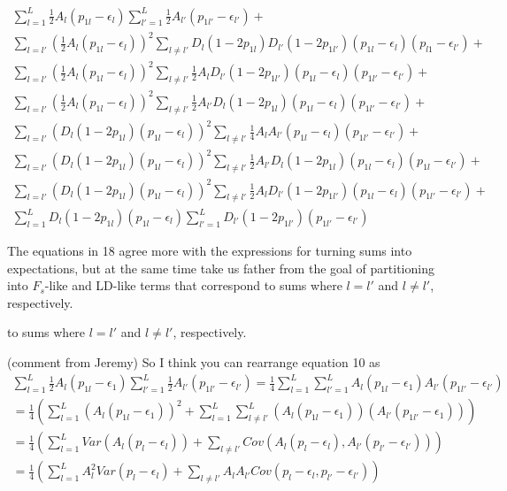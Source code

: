 \documentclass[a4paper,10pt]{article}
\newcommand{\jb}[1]{{\color{blue} (#1)} }
\begin{document}
\begin{equation}
  \begin{split}
   \sum^L_{l=1}\frac{1}{2}A_l(p_{1l}-\epsilon_{l})
   \sum^L_{l'=1}\frac{1}{2}A_{l'}(p_{1l'}-\epsilon_{l'}) +
   \\
   \sum_{l=l'}(\frac{1}{2}A_l(p_{1l}-\epsilon_l))^2 \sum_{l \neq
     l'}D_l(1-2p_{1l})D_{l'}(1-2p_{1l'})(p_{1l}-\epsilon_l)(p_{l1}-\epsilon_{l'})+ 
   \\
     \sum_{l=l'}(\frac{1}{2}A_l(p_{1l}-\epsilon_l))^2\sum_{l \neq
       l'}\frac{1}{2}A_{l}D_{l'}(1-2p_{1l'})(p_{1l}-\epsilon_l)(p_{1l'}-\epsilon_{l'})+
     \\
     \sum_{l=l'}(\frac{1}{2}A_l(p_{1l}-\epsilon_l))^2\sum_{l \neq
       l'}\frac{1}{2}A_{l'}D_l(1-2p_{1l})(p_{1l}-\epsilon_l)(p_{1l'}-\epsilon_{l'})+
   \\
   \sum_{l=l'}(D_l(1-2p_{1l})(p_{1l}-\epsilon_l))^2 \sum_{l \neq
     l'}\frac{1}{4}A_lA_{l'}(p_{1l}-\epsilon_l)(p_{1l'}-\epsilon_{l'}) +
   \\
   \sum_{l=l'}(D_l(1-2p_{1l})(p_{1l}-\epsilon_l))^2 \sum_{l\neq
     l'}
   \frac{1}{2}A_{l'}D_l(1-2p_{1l})(p_{1l}-\epsilon_l)(p_{1l}-\epsilon_{l'})+
   \\
   \sum_{l=l'}(D_l(1-2p_{1l})(p_{1l}-\epsilon_l))^2 \sum_{l\neq
     l'}
   \frac{1}{2}A_{l}D_{l'}(1-2p_{1l'})(p_{1l}-\epsilon_l)(p_{1l'}-\epsilon_{l'})+
   \\
    \sum^L_{l=1}D_l(1-2p_{1l})(p_{1l}-\epsilon_l) \sum^L_{l'=1}D_{l'}(1-2p_{1l'})(p_{1l'}-\epsilon_{l'})
 \end{split} \label{big-expansion}
\end{equation}

   
The equations in 18 agree more with the expressions for turning sums
into expectations, but at the same time take us father from the goal
of partitioning into $ F_{s}$-like and LD-like terms that correspond
to sums where $l = l'$ and $ l \neq l'$, respectively. 

to sums where $l = l'$ and $ l \neq l'$, respectively.

\jb{comment from Jeremy}
So I think you can rearrange equation 10 as
\begin{align}
  \sum^L_{l=1}\frac{1}{2}A_l(p_{1l}-\epsilon_{1}) \sum^L_{l'=1}\frac{1}{2}A_{l'}(p_{1l'}-\epsilon_{l'}) =   \frac{1}{4}\sum^L_{l=1}\sum^L_{l'=1}A_l(p_{1l}-\epsilon_{1})A_{l'}(p_{1l'}-\epsilon_{l'}) \\
                                             = \frac{1}{4}\left(\sum^L_{l=1}(A_l(p_{1l}-\epsilon_{1}))^2 + \sum^L_{l=1}\sum^L_{l\neq l'}(A_l(p_{1l}-\epsilon_{1}))(A_{l'}(p_{1l'}-\epsilon_{1}))\right) \label{fst-ld-partition}\\
                                             = \frac{1}{4}\left(\sum_{l=1}^L Var\left(A_l(p_l - \epsilon_l)\right) + \sum_{l \neq l'}   Cov\left(A_l(p_l - \epsilon_l) , A_{l'}(p_{l'} - \epsilon_{l'})\right)\right) \label{penult} \\
                                             =  \frac{1}{4}\left(\sum_{l=1}^L A_l^2 Var\left(p_l - \epsilon_l\right) + \sum_{l \neq l'} A_l A_{l'} Cov\left(p_l - \epsilon_l , p_{l'} - \epsilon_{l'}\right)\right) \label{ult}
  \end{align}
\end{document}
